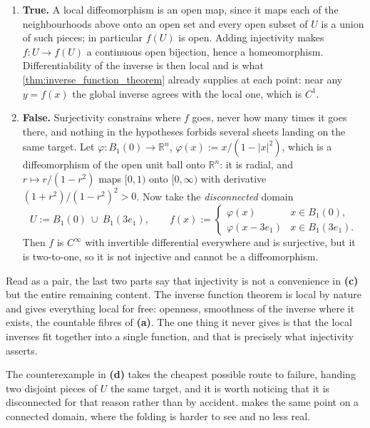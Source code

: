 \begin{exercisesolution}
\begin{enumerate}[label=\textbf{(\alph*)}]
    of total volume $< \varepsilon$ therefore covers $f(Z \cap B_i)$ by cubes of total volume
    $< (L_i\sqrt n)^n\varepsilon$, so $f(Z\cap B_i)$ is null. A countable union of Lebesgue null
    sets is Lebesgue null, so $f(Z)$ is null.
  \item \textbf{True.} A local diffeomorphism is an open map, since it maps each of the
    neighbourhoods above onto an open set and every open subset of $U$ is a union of such pieces;
    in particular $f(U)$ is open. Adding injectivity makes $f : U \to f(U)$ a continuous open
    bijection, hence a homeomorphism. Differentiability of the inverse is then local and is what
    \cref{thm:inverse_function_theorem} already supplies at each point: near any $y = f(x)$ the
    global inverse agrees with the local one, which is $C^1$.
  \item \textbf{False.} Surjectivity constrains where $f$ goes, never how many times it goes
    there, and nothing in the hypotheses forbids several sheets landing on the same target. Let
    $\varphi : B_1(0) \to \mathbb{R}^n$, $\varphi(x) := x/(1-\lvert x\rvert^2)$, which is a
    diffeomorphism of the open unit ball onto $\mathbb{R}^n$: it is radial, and
    $r \mapsto r/(1-r^2)$ maps $[0,1)$ onto $[0,\infty)$ with derivative
    $(1+r^2)/(1-r^2)^2 > 0$. Now take the \emph{disconnected} domain
    \[U := B_1(0)\ \cup\ B_1(3e_1), \qquad
      f(x) := \begin{cases} \varphi(x) & x \in B_1(0), \\
        \varphi(x - 3e_1) & x \in B_1(3e_1).\end{cases}\]
    Then $f$ is $C^\infty$ with invertible differential everywhere and is surjective, but it is
    two-to-one, so it is not injective and cannot be a diffeomorphism.
\end{enumerate}

\begin{remark}
Read as a pair, the last two parts say that injectivity is not a convenience in \textbf{(c)} but
the entire remaining content. The inverse function theorem is local by nature and gives
everything local for free: openness, smoothness of the inverse where it exists, the countable
fibres of \textbf{(a)}. The one thing it never gives is that the local inverses fit together into
a single function, and that is precisely what injectivity asserts.

The counterexample in \textbf{(d)} takes the cheapest possible route to failure, handing two
disjoint pieces of $U$ the same target, and it is worth noticing that it is disconnected for that
reason rather than by accident.  makes the same
point on a connected domain, where the folding is harder to see and no less real.
\end{remark}
\end{exercisesolution}

